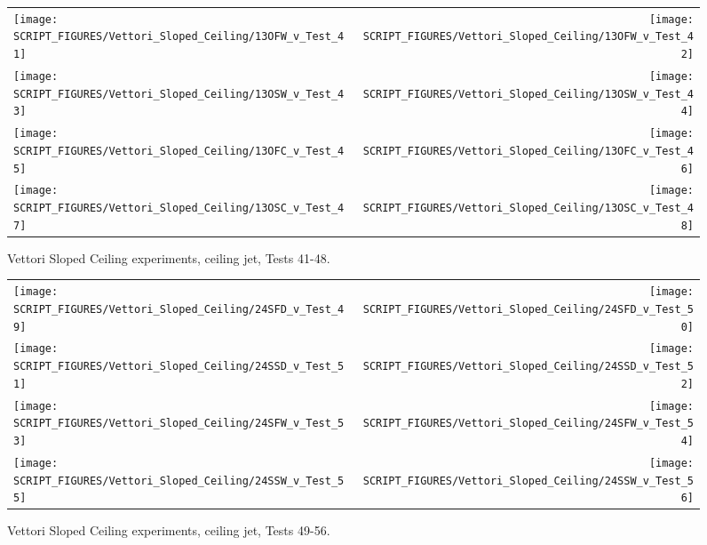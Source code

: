 \begin{figure}[p]
\begin{tabular*}{\textwidth}{l@{\extracolsep{\fill}}r}
\texttt{[image: SCRIPT\_FIGURES/Vettori\_Sloped\_Ceiling/13OFW\_v\_Test\_41]} &
\texttt{[image: SCRIPT\_FIGURES/Vettori\_Sloped\_Ceiling/13OFW\_v\_Test\_42]} \\
\texttt{[image: SCRIPT\_FIGURES/Vettori\_Sloped\_Ceiling/13OSW\_v\_Test\_43]} &
\texttt{[image: SCRIPT\_FIGURES/Vettori\_Sloped\_Ceiling/13OSW\_v\_Test\_44]} \\
\texttt{[image: SCRIPT\_FIGURES/Vettori\_Sloped\_Ceiling/13OFC\_v\_Test\_45]} &
\texttt{[image: SCRIPT\_FIGURES/Vettori\_Sloped\_Ceiling/13OFC\_v\_Test\_46]} \\
\texttt{[image: SCRIPT\_FIGURES/Vettori\_Sloped\_Ceiling/13OSC\_v\_Test\_47]} &
\texttt{[image: SCRIPT\_FIGURES/Vettori\_Sloped\_Ceiling/13OSC\_v\_Test\_48]} \\
\end{tabular*}
\caption{Vettori Sloped Ceiling experiments, ceiling jet, Tests 41-48.}
\label{Vettori_Sloped_6}
\end{figure}

\begin{figure}[p]
\begin{tabular*}{\textwidth}{l@{\extracolsep{\fill}}r}
\texttt{[image: SCRIPT\_FIGURES/Vettori\_Sloped\_Ceiling/24SFD\_v\_Test\_49]} &
\texttt{[image: SCRIPT\_FIGURES/Vettori\_Sloped\_Ceiling/24SFD\_v\_Test\_50]} \\
\texttt{[image: SCRIPT\_FIGURES/Vettori\_Sloped\_Ceiling/24SSD\_v\_Test\_51]} &
\texttt{[image: SCRIPT\_FIGURES/Vettori\_Sloped\_Ceiling/24SSD\_v\_Test\_52]} \\
\texttt{[image: SCRIPT\_FIGURES/Vettori\_Sloped\_Ceiling/24SFW\_v\_Test\_53]} &
\texttt{[image: SCRIPT\_FIGURES/Vettori\_Sloped\_Ceiling/24SFW\_v\_Test\_54]} \\
\texttt{[image: SCRIPT\_FIGURES/Vettori\_Sloped\_Ceiling/24SSW\_v\_Test\_55]} &
\texttt{[image: SCRIPT\_FIGURES/Vettori\_Sloped\_Ceiling/24SSW\_v\_Test\_56]} \\
\end{tabular*}
\caption{Vettori Sloped Ceiling experiments, ceiling jet, Tests 49-56.}
\label{Vettori_Sloped_7}
\end{figure}

